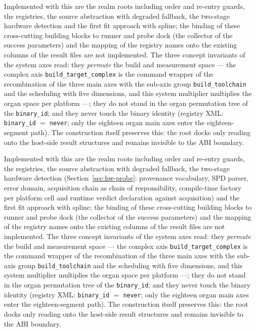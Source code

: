 \begin{nurlang}
Implemented with this are the realm roots including order and re-entry guards, the registries, the
source abstraction with degraded fallback, the two-stage hardware detection and the first fit approach
with spline; the binding of these cross-cutting building blocks to runner and probe dock (the collector
of the success parameters) and the mapping of the registry names onto the existing columns of the
result files are not implemented. The three concept invariants of the system axes read: they
\emph{permute} the build and measurement space --- the complex axis \texttt{build\_target\_complex} is
the command wrapper of the recombination of the three main axes with the sub-axis group
\texttt{build\_toolchain} and the scheduling with five dimensions, and this system multiplier
multiplies the organ space per platform ---; they do not stand in the organ permutation tree of the
\texttt{binary\_id}; and they never touch the binary identity (registry XML\@: \texttt{binary\_id} $=$
\texttt{never}; only the eighteen organ main axes enter the eighteen-segment path). The construction
itself preserves this: the root docks only reading onto the host-side result structures and remains
invisible to the ABI boundary.
\end{nurlang}
\begin{nurkurz}
Implemented with this are the realm roots including order and re-entry guards, the registries, the
source abstraction with degraded fallback, the two-stage hardware detection
(Section~\ref{sec:hw-probe}: provenance vocabulary, SPD parser, error domain, acquisition chain as
chain of responsibility, compile-time factory per platform cell and runtime verdict declaration against
acquisition) and the first fit approach with spline; the binding of these cross-cutting building blocks
to runner and probe dock (the collector of the success parameters) and the mapping of the registry
names onto the existing columns of the result files are not implemented. The three concept invariants
of the system axes read: they \emph{permute} the build and measurement space --- the complex axis
\texttt{build\_target\_complex} is the command wrapper of the recombination of the three main axes
with the sub-axis group \texttt{build\_toolchain} and the scheduling with five dimensions, and this
system multiplier multiplies the organ space per platform ---; they do not stand in the organ
permutation tree of the \texttt{binary\_id}; and they never touch the binary identity (registry
XML\@: \texttt{binary\_id} $=$ \texttt{never}; only the eighteen organ main axes enter the
eighteen-segment path). The construction itself preserves this: the root docks only reading onto the
host-side result structures and remains invisible to the ABI boundary.
\end{nurkurz}

